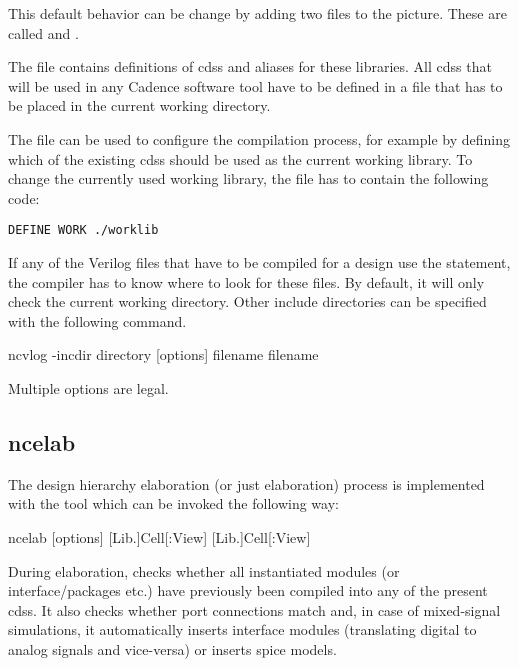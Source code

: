 This default behavior can be change by adding two files to the picture. These
are called  and .

The  file contains definitions of \glspl{cds}
and aliases for these libraries. All \glspl{cds} that will be used in any
Cadence software tool have to be defined in a  file that has to be
placed in the current working directory.

The  file can be used to configure the
compilation process, for example by defining which of the existing \glspl{cds}
should be used as the current working library. To change the currently used
working library, the  file has to contain the following code:
\begin{verbatim}
DEFINE WORK ./worklib
\end{verbatim}

If any of the Verilog files that have to be compiled for a design use the
 statement, the compiler has to know where to look for these
files. By default, it will only check the current working directory. Other
include directories can be specified with the following command.
\begin{lstbashplain}
 ncvlog -incdir directory [options] filename { filename }
\end{lstbashplain}
Multiple  options are legal.

\subsection{ncelab}
The design hierarchy elaboration (or just elaboration) process is implemented
with the tool  which can be invoked the following way:
\begin{lstbashplain}
 ncelab [options] [Lib.]Cell[:View] { [Lib.]Cell[:View] }
\end{lstbashplain}

During elaboration,  checks whether all instantiated modules (or
interface/packages etc.) have previously been compiled into any of the present
\glspl{cds}. It also checks whether port connections match and, in case of
mixed-signal simulations, it automatically inserts interface modules
(translating digital to analog signals and vice-versa) or inserts spice models. 

